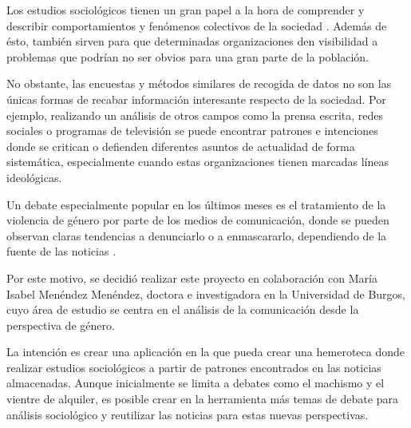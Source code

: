 
Los estudios sociológicos tienen un gran papel a la hora de comprender y describir comportamientos y fenómenos colectivos de la sociedad \cite{wiki:estudiosociologico}. Además de ésto, también sirven para que determinadas organizaciones den visibilidad a problemas que podrían no ser obvios para una gran parte de la población.

No obstante, las encuestas y métodos similares de recogida de datos no son las únicas formas de recabar información interesante respecto de la sociedad. Por ejemplo, realizando un análisis de otros campos como la prensa escrita, redes sociales o programas de televisión se puede encontrar patrones e intenciones donde se critican o defienden diferentes asuntos de actualidad de forma sistemática, especialmente cuando estas organizaciones tienen marcadas líneas ideológicas.

Un debate especialmente popular en los últimos meses es el tratamiento de la violencia de género por parte de los medios de comunicación, donde se pueden observan claras tendencias a denunciarlo o a enmascararlo, dependiendo de la fuente de las noticias \cite{RICD2653}.

Por este motivo, se decidió realizar este proyecto en colaboración con María Isabel Menéndez Menéndez, doctora e investigadora en la Universidad de Burgos, cuyo área de estudio se centra en el análisis de la comunicación desde la perspectiva de género. 

La intención es crear una aplicación en la que pueda crear una hemeroteca donde realizar estudios sociológicos a partir de patrones encontrados en las noticias almacenadas. Aunque inicialmente se limita a debates como el machismo y el vientre de alquiler, es posible crear en la herramienta más temas de debate para análisis sociológico y reutilizar las noticias para estas nuevas perspectivas.

